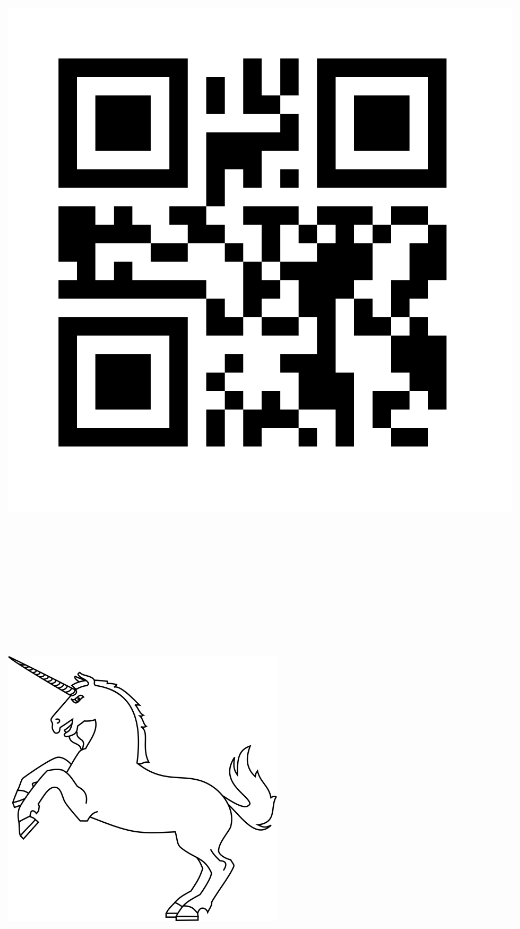 \documentclass{article}
\begin{document}
\pagestyle{empty}
\begin{center}
\includegraphics[height=20cm]{Licornes}

\vspace{5mm}

\includegraphics[height=7cm]{Licorne}
\end{center}
\end{document}
